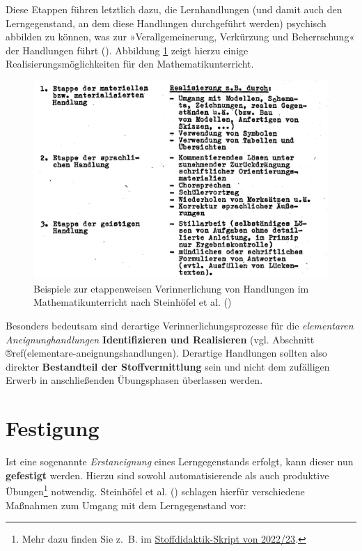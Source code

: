 \documentclass[
]{scrbook}
\theoremstyle{definition}
\theoremstyle{definition}
\theoremstyle{definition}
\theoremstyle{definition}
\theoremstyle{remark}
\begin{document}
Diese Etappen führen letztlich dazu, die Lernhandlungen (und damit auch den Lerngegenstand, an dem diese Handlungen durchgeführt werden) psychisch abbilden zu können, was zur »Verallgemeinerung, Verkürzung und Beherrschung« der Handlungen führt (). Abbildung \ref{fig:Etappen} zeigt hierzu einige Realisierungsmöglichkeiten für den Mathematikunterricht.



\begin{figure}

{\centering \includegraphics[width=0.9\linewidth]{pictures/6-Etappen} 

}

\caption{Beispiele zur etappenweisen Verinnerlichung von Handlungen im Mathematikunterricht nach Steinhöfel et al. ()}\label{fig:Etappen}
\end{figure}

Besonders bedeutsam sind derartige Verinnerlichungsprozesse für die \emph{elementaren Aneignunghandlungen} \textbf{Identifizieren und Realisieren} (vgl. Abschnitt ®ref(elementare-aneignungshandlungen). Derartige Handlungen sollten also direkter \textbf{Bestandteil der Stoffvermittlung} sein und nicht dem zufälligen Erwerb in anschließenden Übungsphasen überlassen werden.

\section{Festigung}\label{festigung}

Ist eine sogenannte \emph{Erstaneignung} eines Lerngegenstands erfolgt, kann dieser nun \textbf{gefestigt} werden. Hierzu sind sowohl automatisierende als auch produktive Übungen\footnote{Mehr dazu finden Sie z.~B. im \href{https://stoffdidaktik.heiko-etzold.de/2022/8-aufgabengestaltung.html\#produktives-üben}{Stoffdidaktik-Skript von 2022/23}.} notwendig. Steinhöfel et al. () schlagen hierfür verschiedene Maßnahmen zum Umgang mit dem Lerngegenstand vor:
\end{document}
